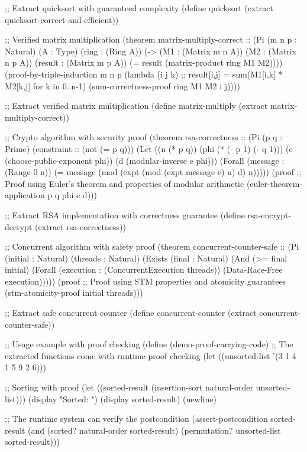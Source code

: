 \begin{example}
\begin{lambdustcode}
;; Extract quicksort with guaranteed complexity
(define quicksort (extract quicksort-correct-and-efficient))

;; Verified matrix multiplication
(theorem matrix-multiply-correct :: 
  (Pi (m n p : Natural) (A : Type) (ring : (Ring A))
      (-> (M1 : (Matrix m n A)) (M2 : (Matrix n p A))
          (result : (Matrix m p A))
          (= result (matrix-product ring M1 M2))))
  (proof-by-triple-induction m n p
    (lambda (i j k)
      ;; result[i,j] = sum(M1[i,k] * M2[k,j] for k in 0..n-1)
      (sum-correctness-proof ring M1 M2 i j))))

;; Extract verified matrix multiplication
(define matrix-multiply (extract matrix-multiply-correct))

;; Crypto algorithm with security proof
(theorem rsa-correctness :: 
  (Pi (p q : Prime) (constraint :: (not (= p q)))
      (Let ((n (* p q))
            (phi (* (- p 1) (- q 1)))
            (e (choose-public-exponent phi))
            (d (modular-inverse e phi)))
        (Forall (message : (Range 0 n))
          (= message (mod (expt (mod (expt message e) n) d) n)))))
  (proof
    ;; Proof using Euler's theorem and properties of modular arithmetic
    (euler-theorem-application p q phi e d)))

;; Extract RSA implementation with correctness guarantee  
(define rsa-encrypt-decrypt (extract rsa-correctness))

;; Concurrent algorithm with safety proof
(theorem concurrent-counter-safe ::
  (Pi (initial : Natural) (threads : Natural)
      (Exists (final : Natural)
        (And (>= final initial)
             (Forall (execution : (ConcurrentExecution threads))
               (Data-Race-Free execution)))))
  (proof
    ;; Proof using STM properties and atomicity guarantees
    (stm-atomicity-proof initial threads)))

;; Extract safe concurrent counter
(define concurrent-counter (extract concurrent-counter-safe))

;; Usage example with proof checking
(define (demo-proof-carrying-code)
  ;; The extracted functions come with runtime proof checking
  (let ((unsorted-list '(3 1 4 1 5 9 2 6)))
    
    ;; Sorting with proof
    (let ((sorted-result (insertion-sort natural-order unsorted-list)))
      (display "Sorted: ") (display sorted-result) (newline)
      
      ;; The runtime system can verify the postcondition
      (assert-postcondition sorted-result
        (and (sorted? natural-order sorted-result)
             (permutation? unsorted-list sorted-result)))
      

\end{lambdustcode}
\end{example}
